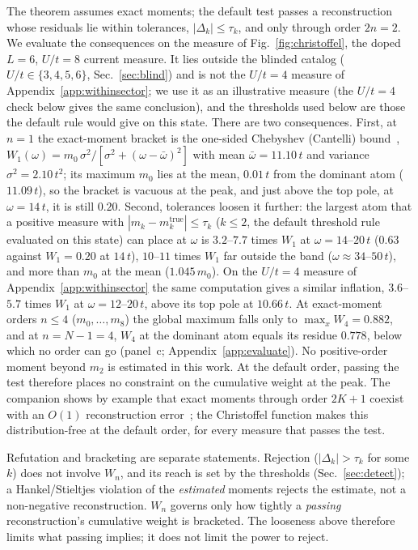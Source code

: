 \documentclass[submission, PhysCore]{SciPost}
\begin{document}
\begin{appendix}
The theorem assumes exact moments; the default test passes a reconstruction whose residuals lie within tolerances, $|\Delta_k|\le\tau_k$, and only through order $2n=2$. We evaluate the consequences on the measure of Fig.~\ref{fig:christoffel}, the doped $L=6$, $U/t=8$ current measure. It lies outside the blinded catalog ($U/t\in\{3,4,5,6\}$, Sec.~\ref{sec:blind}) and is not the $U/t=4$ measure of Appendix~\ref{app:withinsector}; we use it as an illustrative measure (the $U/t=4$ check below gives the same conclusion), and the thresholds used below are those the default rule would give on this state. There are two consequences. First, at $n=1$ the exact-moment bracket is the one-sided Chebyshev (Cantelli) bound~\cite{KarlinStudden1966}, $W_1(\omega)=m_0\,\sigma^2/[\sigma^2+(\omega-\bar\omega)^2]$ with mean $\bar\omega=11.10\,t$ and variance $\sigma^2=2.10\,t^2$; its maximum $m_0$ lies at the mean, $0.01\,t$ from the dominant atom ($11.09\,t$), so the bracket is vacuous at the peak, and just above the top pole, at $\omega=14\,t$, it is still $0.20$. Second, tolerances loosen it further: the largest atom that a positive measure with $|m_k-m_k^{\mathrm{true}}|\le\tau_k$ ($k\le2$, the default threshold rule evaluated on this state) can place at $\omega$ is $3.2$--$7.7$ times $W_1$ at $\omega=14$--$20\,t$ ($0.63$ against $W_1=0.20$ at $14\,t$), $10$--$11$ times $W_1$ far outside the band ($\omega\approx34$--$50\,t$), and more than $m_0$ at the mean ($1.045\,m_0$). On the $U/t=4$ measure of Appendix~\ref{app:withinsector} the same computation gives a similar inflation, $3.6$--$5.7$ times $W_1$ at $\omega=12$--$20\,t$, above its top pole at $10.66\,t$. At exact-moment orders $n\le4$ ($m_0,\dots,m_8$) the global maximum falls only to $\max_xW_4=0.882$, and at $n=N-1=4$, $W_4$ at the dominant atom equals its residue $0.778$, below which no order can go (panel~c; Appendix~\ref{app:evaluate}). No positive-order moment beyond $m_2$ is estimated in this work. At the default order, passing the test therefore places no constraint on the cumulative weight at the peak. The companion shows by example that exact moments through order $2K+1$ coexist with an $O(1)$ reconstruction error~\cite{SQDspec2608}; the Christoffel function makes this distribution-free at the default order, for every measure that passes the test.

Refutation and bracketing are separate statements. Rejection ($|\Delta_k|>\tau_k$ for some $k$) does not involve $W_n$, and its reach is set by the thresholds (Sec.~\ref{sec:detect}); a Hankel/Stieltjes violation of the \emph{estimated} moments rejects the estimate, not a non-negative reconstruction. $W_n$ governs only how tightly a \emph{passing} reconstruction's cumulative weight is bracketed. The looseness above therefore limits what passing implies; it does not limit the power to reject.


\end{appendix}
\end{document}
